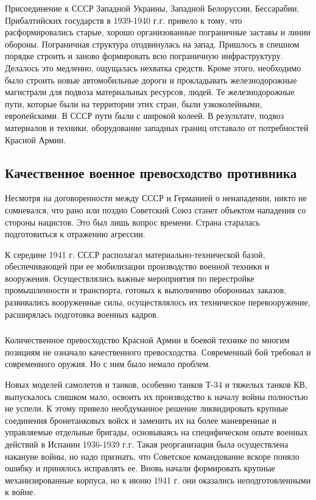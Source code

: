 \documentclass[12pt]{article}
\newcommand{\orange}[1]{{\color{orange}{#1}}}
\begin{document}
  Присоединение к СССР Западной Украины, Западной Белоруссии, Бессарабии, Прибалтийских государств в 1939-1940 г.г. привело к тому,
  что расформировались старые, хорошо организованные пограничные заставы и линии обороны.
  Пограничная структура отодвинулась на запад.
  Пришлось в спешном порядке строить и заново формировать всю пограничную инфраструктуру.
  Делалось это медленно, ощущалась нехватка средств.
  Кроме этого, необходимо было строить новые автомобильные дороги и прокладывать железнодорожные магистрали для подвоза материальных ресурсов, людей.
  Те железнодорожные пути, которые были на территории этих стран, были узкоколейными, европейскими.
  В СССР пути были с широкой колеей.
  В результате, подвоз материалов и техники, оборудование западных границ отставало от потребностей Красной Армии.

  \subsection{Качественное военное превосходство противника}
  Несмотря на договоренности между СССР и Германией о ненападении, никто не сомневался,
  что рано или поздно Советский Союз станет объектом нападения со стороны нацистов.
  Это был лишь вопрос времени.
  Страна старалась подготовиться к отражению агрессии.

  К середине 1941 г. СССР располагал материально-технической базой, обеспечивающей при ее мобилизации
  производство военной техники и вооружения.
  Осуществлялись важные мероприятия по перестройке промышленности и транспорта, готовых к выполнению оборонных заказов,
  развивались вооруженные силы, осуществлялось их техническое перевооружение, расширялась подготовка военных кадров.

  \subsubsection*{\orange{Что же помешало воспользоваться всей техникой и вооружением для отражения атаки фашистской армии?}}
  Количественное превосходство Красной Армии в боевой технике по многим позициям не означало качественного превосходства.
  Современный бой требовал и современного оружия.
  Но с ним было немало проблем.

  Новых моделей самолетов и танков, особенно танков Т-34 и тяжелых танков КВ, выпускалось слишком мало,
  освоить их производство к началу войны полностью не успели.
  К этому привело необдуманное решение ликвидировать крупные соединения бронетанковых войск и заменить их
  на более маневренные и управляемые отдельные бригады, основываясь на специфическом опыте военных действий в Испании 1936-1939 г.г.
  Такая реорганизация была осуществлена накануне войны, но надо признать,
  что Советское командование вскоре поняло ошибку и принялось исправлять ее.
  Вновь начали формировать крупные механизированные корпуса, но к июню 1941 г. они оказались неподготовленными к войне.
\end{document}
